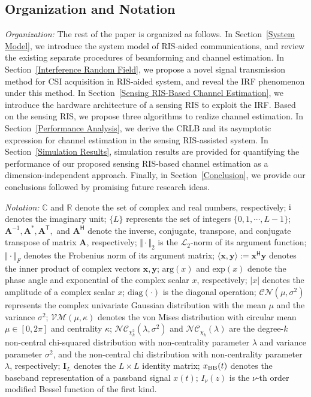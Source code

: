 \documentclass[journal,twocolumn]{IEEEtran}
\theoremstyle{nonumberplain}
\def \T {\bm \Theta}
\def \VM {\mathcal{VM}}
\def \nc {\mathcal{NC}}
\def \T {^{\mathsf{T}}}
\def \H {^{\mathsf{H}}}
\def \ri {{\rm i}}
\begin{document}
\subsection{Organization and Notation}

\textit{Organization:}
The rest of the paper is organized as follows.
In Section~\ref{System Model}, we introduce the system model of RIS-aided communications, and review the existing separate procedures of beamforming and channel estimation.
In Section~\ref{Interference Random Field}, we propose a novel signal transmission method for CSI acquisition in RIS-aided system, and reveal the \ac{IRF} phenomenon under this method.
In Section~\ref{Sensing RIS-Based Channel Estimation}, we introduce the hardware architecture of a sensing RIS to exploit the \ac{IRF}.
Based on the sensing RIS, we propose three algorithms to realize channel estimation.
In Section~\ref{Performance Analysis}, we derive the \ac{CRLB} and its asymptotic expression for channel estimation in the sensing RIS-assisted system.
In Section~\ref{Simulation Results}, simulation results are provided for quantifying the performance of our proposed sensing RIS-based channel estimation as a dimension-independent approach.
Finally, in Section~\ref{Conclusion}, we provide our conclusions followed by promising future research ideas.

\textit{Notation:} $\mathbb C$ and $\mathbb R$ denote the set of complex and real numbers, respectively;
$\ri$ denotes the imaginary unit; 
$\{L\}$ represents the set of integers $\{0,1,\cdots,L-1\}$;
$\bm A^{-1}, \bm A^*,\bm A\T,$ and $\bm A\H$ denote the inverse, conjugate, transpose, and conjugate transpose of matrix $\bm A$, respectively; 
$\Vert \cdot\Vert_{2}$ is the $\mathcal{L}_{2}$-norm of its argument function;
$\Vert \cdot \Vert_{F}$ denotes the Frobenius norm of its argument matrix;  
$\langle{\bm x}, {\bm y}\rangle := {\bm x}\H {\bm y}$ denotes the inner product of complex vectors ${\bm x}, {\bm y}$; 
$\text{arg}(x)$ and $\text{exp}(x)$ denote the phase angle and exponential of the complex scalar $x$, respectively;
$\vert x\vert$ denotes the amplitude
of a complex scalar $x$; 
$\text{diag}(\cdot )$ is the diagonal operation;
$\mathcal{CN}\left(\mu, \sigma^2 \right)$ represents the complex univariate Gaussian distribution with the mean $\mu$ and the variance $\sigma^2$;
$\VM(\mu, \kappa)$ denotes the von Mises distribution with circular mean $\mu\in [0,2\pi]$ and centrality $\kappa$;
$\nc_{\chi_k^2}(\lambda, \sigma^2)$ and $\nc_{\chi_k}(\lambda)$ are the degree-$k$ non-central chi-squared distribution with  non-centrality parameter $\lambda$ and variance parameter $\sigma^2$, and the non-central chi distribution with non-centrality parameter $\lambda$, respectively; 
$\bm I_{L}$ denotes the $L\times L$ identity matrix;
$x_{\rm BB}(t)$ denotes the baseband representation of a passband signal $x(t)$;
$I_\nu(z)$ is the $\nu$-th order modified Bessel function of the first kind. 
\end{document}
